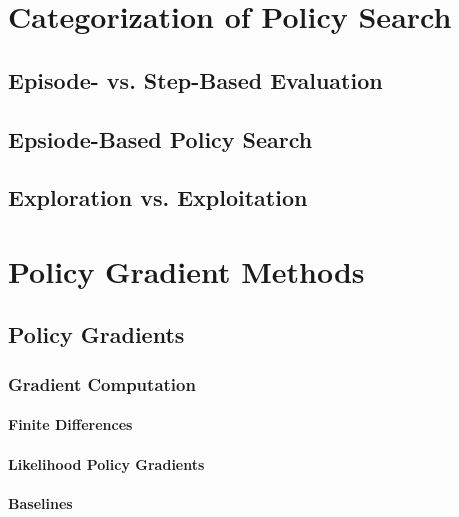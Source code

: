 	\section{Categorization of Policy Search} %

		\subsection{Episode- vs. Step-Based Evaluation} %

		\subsection{Epsiode-Based Policy Search} %

		\subsection{Exploration vs. Exploitation} %

	\section{Policy Gradient Methods} %

		\subsection{Policy Gradients} %

			\subsubsection{Gradient Computation} %

				\paragraph{Finite Differences} %

				\paragraph{Likelihood Policy Gradients} %

				\paragraph{Baselines} %

